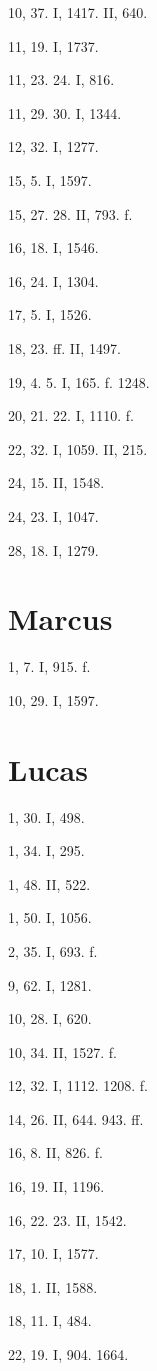 10, 37. I, 1417. II, 640.

11, 19. I, 1737.

11, 23. 24. I, 816.

11, 29. 30. I, 1344.

12, 32. I, 1277.

15, 5. I, 1597.

15, 27. 28. II, 793. f.

16, 18. I, 1546.

16, 24. I, 1304.

17, 5. I, 1526.

18, 23. ff. II, 1497.

19, 4. 5. I, 165. f. 1248.

20, 21. 22. I, 1110. f.

22, 32. I, 1059. II, 215.

24, 15. II, 1548.

24, 23. I, 1047.

28, 18. I, 1279.

\section{Marcus}

1, 7. I, 915. f.

10, 29. I, 1597.

\section{Lucas}

1, 30. I, 498.

1, 34. I, 295.

1, 48. II, 522.

1, 50. I, 1056.

2, 35. I, 693. f.

9, 62. I, 1281.

10, 28. I, 620.

10, 34. II, 1527. f.

12, 32. I, 1112. 1208. f.

14, 26. II, 644. 943. ff.

16, 8. II, 826. f.

16, 19. II, 1196.

16, 22. 23. II, 1542.

17, 10. I, 1577.

18, 1. II, 1588.

18, 11. I, 484.

22, 19. I, 904. 1664.

